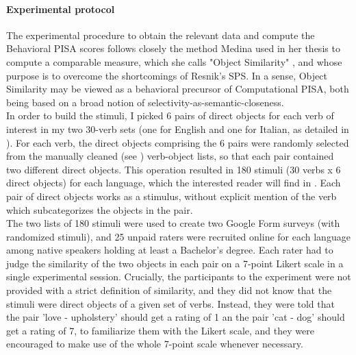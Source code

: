 
\paragraph{Experimental protocol}
The experimental procedure to obtain the relevant data and compute the Behavioral PISA scores follows closely the method Medina used in her thesis to compute a comparable measure, which she calls "Object Similarity" \parencite[173-178]{Medina2007}, and whose purpose is to overcome the shortcomings of Resnik's SPS. In a sense, Object Similarity may be viewed as a behavioral precursor of Computational PISA, both being based on a broad notion of selectivity-as-semantic-closeness.\\
In order to build the stimuli, I picked 6 pairs of direct objects for each verb of interest in my two 30-verb sets (one for English and one for Italian, as detailed in ). For each verb, the direct objects comprising the 6 pairs were randomly selected from the manually cleaned (see ) verb-object lists, so that each pair contained two different direct objects. This operation resulted in 180 stimuli (30 verbs x 6 direct objects) for each language, which the interested reader will find in . Each pair of direct objects works as a stimulus, without explicit mention of the verb which subcategorizes the objects in the pair.\\
The two lists of 180 stimuli were used to create two Google Form surveys (with randomized stimuli), and 25 unpaid raters were recruited online for each language among native speakers holding at least a Bachelor's degree. Each rater had to judge the similarity of the two objects in each pair on a 7-point Likert scale in a single experimental session. Crucially, the participants to the experiment were not provided with a strict definition of similarity, and they did not know that the stimuli were direct objects of a given set of verbs. Instead, they were told that the pair 'love - upholstery' should get a rating of 1 an the pair 'cat - dog' should get a rating of 7, to familiarize them with the Likert scale, and they were encouraged to make use of the whole 7-point scale whenever necessary.

